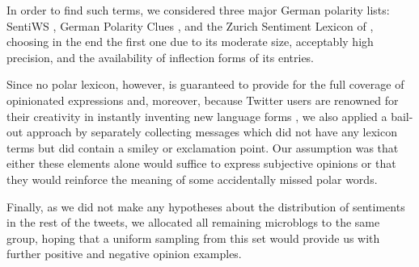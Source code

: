 In order to find such terms, we considered three major German polarity
lists: SentiWS \cite{Remus:10}, German Polarity Clues
\cite{Waltinger:10}, and the Zurich Sentiment Lexicon of
\citet{Clematide:10}, choosing in the end the first one due to its
moderate size, acceptably high precision, and the availability of
inflection forms of its entries.

Since no polar lexicon, however, is guaranteed to provide for the full
coverage of opinionated expressions and, moreover, because Twitter
users are renowned for their creativity in instantly inventing new
language forms \cite{Eisenstein:13}, we also applied a bail-out
approach by separately collecting messages which did not have any
lexicon terms but did contain a smiley or exclamation point.  Our
assumption was that either these elements alone would suffice to
express subjective opinions or that they would reinforce the meaning
of some accidentally missed polar words.

Finally, as we did not make any hypotheses about the distribution of
sentiments in the rest of the tweets, we allocated all remaining
microblogs to the same group, hoping that a uniform sampling from this
set would provide us with further positive and negative opinion
examples.

